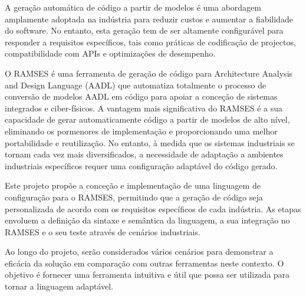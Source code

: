 
%

A geração automática de código a partir de modelos é uma abordagem amplamente adoptada na indústria para reduzir custos e aumentar a fiabilidade do software. No entanto, esta geração tem de ser altamente configurável para responder a requisitos específicos, tais como práticas de codificação de projectos, compatibilidade com APIs e optimizações de desempenho.

O RAMSES é uma ferramenta de geração de código para Architecture Analysis and Design Language (AADL) que automatiza totalmente o processo de conversão de modelos AADL em código para apoiar a conceção de sistemas integrados e ciber-físicos. A vantagem mais significativa do RAMSES é a sua capacidade de gerar automaticamente código a partir de modelos de alto nível, eliminando os pormenores de implementação e proporcionando uma melhor portabilidade e reutilização. No entanto, à medida que os sistemas industriais se tornam cada vez mais diversificados, a necessidade de adaptação a ambientes industriais específicos requer uma configuração adaptável do código gerado.

Este projeto propõe a conceção e implementação de uma linguagem de configuração para o RAMSES, permitindo que a geração de código seja personalizada de acordo com os requisitos específicos de cada indústria. As etapas envoluem a definição da sintaxe e semântica da linguagem, a sua integração no RAMSES e o seu teste através de cenários industriais.

Ao longo do projeto, serão considerados vários cenários para demonstrar a eficácia da solução em comparação com outras ferramentas neste contexto. O objetivo é fornecer uma ferramenta intuitiva e útil que possa ser utilizada para tornar a linguagem adaptável.


